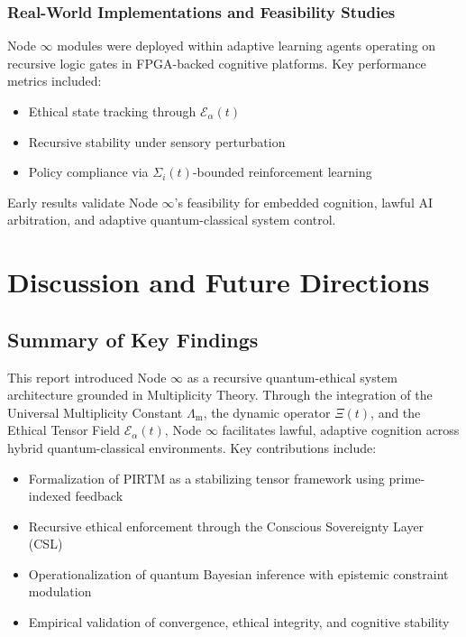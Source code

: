 \documentclass[12pt]{article}
\newcommand{\LambdaM}{\Lambda_{\mathrm{m}}}
\begin{document}
\subsubsection*{Real-World Implementations and Feasibility Studies}

Node \( \infty \) modules were deployed within adaptive learning agents operating on recursive logic gates in FPGA-backed cognitive platforms. Key performance metrics included:

\begin{itemize}
  \item Ethical state tracking through $\mathcal{E}_\alpha(t)$
  \item Recursive stability under sensory perturbation
  \item Policy compliance via $\Sigma_i(t)$-bounded reinforcement learning
\end{itemize}

Early results validate Node \( \infty \)’s feasibility for embedded cognition, lawful AI arbitration, and adaptive quantum-classical system control.

\section{Discussion and Future Directions}

\subsection{Summary of Key Findings}

This report introduced Node \( \infty \) as a recursive quantum-ethical system architecture grounded in Multiplicity Theory. Through the integration of the Universal Multiplicity Constant $\LambdaM$, the dynamic operator $\Xi(t)$, and the Ethical Tensor Field $\mathcal{E}_\alpha(t)$, Node \( \infty \) facilitates lawful, adaptive cognition across hybrid quantum-classical environments. Key contributions include:

\begin{itemize}
  \item Formalization of PIRTM as a stabilizing tensor framework using prime-indexed feedback
  \item Recursive ethical enforcement through the Conscious Sovereignty Layer (CSL)
  \item Operationalization of quantum Bayesian inference with epistemic constraint modulation
  \item Empirical validation of convergence, ethical integrity, and cognitive stability
\end{itemize}
\end{document}
